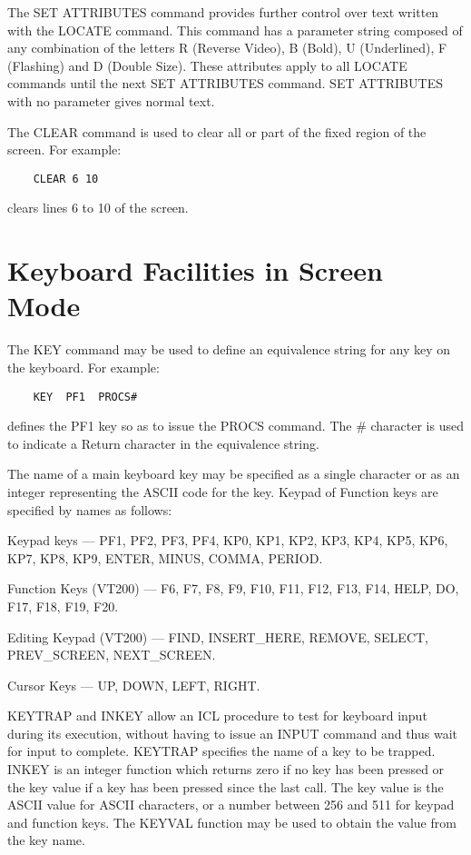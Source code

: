 \documentclass[twoside,11pt]{report}
\newcommand{\xlabel}[1]{}
\begin{document}
The SET ATTRIBUTES command provides further control over text written with
the LOCATE command. This command has a parameter string composed of any
combination of the letters R (Reverse Video), B (Bold), U (Underlined),
F (Flashing) and D (Double Size). These attributes apply to all LOCATE commands
until the next SET ATTRIBUTES command. SET ATTRIBUTES with no parameter
gives normal text.

The CLEAR command is used to clear all or part of the fixed region of the
screen. For example:
\begin{verbatim}
    CLEAR 6 10
\end{verbatim}
clears lines 6 to 10 of the screen.

\section{\xlabel{keyboard_facilities_in_screen_mode}Keyboard Facilities in Screen Mode}

The KEY command may be used to define an equivalence string for any key
on the keyboard. For example:
\begin{verbatim}
    KEY  PF1  PROCS#
\end{verbatim}
defines the PF1 key so as to issue the PROCS command. The \# character is
used to indicate a Return character in the equivalence string.

The name of a main keyboard key may be specified as a single character or
as an integer representing the ASCII code for the key. Keypad of Function
keys are specified by names as follows:

Keypad keys --- PF1, PF2, PF3, PF4, KP0, KP1, KP2, KP3, KP4, KP5, KP6, KP7,
KP8, KP9, ENTER, MINUS, COMMA, PERIOD.

Function Keys (VT200) --- F6, F7, F8, F9, F10, F11, F12, F13, F14, HELP,
DO, F17, F18, F19, F20.

Editing Keypad (VT200) --- FIND, INSERT\_HERE, REMOVE, SELECT, PREV\_SCREEN,
NEXT\_SCREEN.

Cursor Keys --- UP, DOWN, LEFT, RIGHT.

KEYTRAP and INKEY allow an ICL procedure to test for keyboard input during
its execution, without having to issue an INPUT command and thus wait for
input to complete. KEYTRAP specifies the name of a key to be trapped. INKEY
is an integer function which returns zero if no key has been pressed or
the key value if a key has been pressed since the last call. The key value
is the ASCII value for ASCII characters, or a number between 256 and 511
for keypad and function keys. The KEYVAL function may be used to obtain
the value from the key name.
\end{document}
